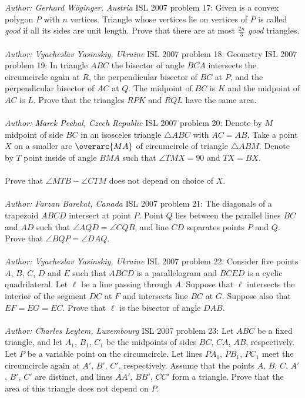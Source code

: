 \textit{Author: Gerhard Wöginger, Austria} 
ISL 2007 problem 17:  Given is a convex polygon $ P$ with $ n$ vertices. Triangle whose vertices lie on vertices of $ P$ is called \textit{good } if all its sides are unit length. Prove that there are at most $ \frac {2n}{3}$ \textit{good} triangles. \\\\
\textit{Author: Vyacheslav Yasinskiy, Ukraine} 
ISL 2007 problem 18:  Geometry 
ISL 2007 problem 19:  In triangle $ ABC$ the bisector of angle $ BCA$ intersects the circumcircle again at $ R$, the perpendicular bisector of $ BC$ at $ P$, and the perpendicular bisector of $ AC$ at $ Q$. The midpoint of $ BC$ is $ K$ and the midpoint of $ AC$ is $ L$. Prove that the triangles $ RPK$ and $ RQL$ have the same area. \\\\
\textit{Author: Marek Pechal, Czech Republic} 
ISL 2007 problem 20:  Denote by $ M$ midpoint of side $ BC$ in an isosceles triangle $ \triangle ABC$ with $ AC = AB$. Take a point $ X$ on a smaller arc $ \overarc{MA}$ of circumcircle of triangle $ \triangle ABM$. Denote by $ T$ point inside of angle $ BMA$ such that $ \angle TMX = 90$ and $ TX = BX$. \\\\
Prove that $ \angle MTB - \angle CTM$ does not depend on choice of $ X$. \\\\
\textit{Author: Farzan Barekat, Canada} 
ISL 2007 problem 21:  The diagonals of a trapezoid $ ABCD$ intersect at point $ P$. Point $ Q$ lies between the parallel lines $ BC$ and $ AD$ such that $ \angle AQD = \angle CQB$, and line $ CD$ separates points $ P$ and $ Q$. Prove that $ \angle BQP = \angle DAQ$. \\\\
\textit{Author: Vyacheslav Yasinskiy, Ukraine} 
ISL 2007 problem 22:  Consider five points $ A$, $ B$, $ C$, $ D$ and $ E$ such that $ ABCD$ is a parallelogram and $ BCED$ is a cyclic quadrilateral. Let $ \ell$ be a line passing through $ A$. Suppose that $ \ell$ intersects the interior of the segment $ DC$ at $ F$ and intersects line $ BC$ at $ G$. Suppose also that $ EF = EG = EC$. Prove that $ \ell$ is the bisector of angle $ DAB$. \\\\
\textit{Author: Charles Leytem, Luxembourg} 
ISL 2007 problem 23:  Let $ ABC$ be a fixed triangle, and let $ A_1$, $ B_1$, $ C_1$ be the midpoints of sides $ BC$, $ CA$, $ AB$, respectively. Let $ P$ be a variable point on the circumcircle. Let lines $ PA_1$, $ PB_1$, $ PC_1$ meet the circumcircle again at $ A'$, $ B'$, $ C'$, respectively. Assume that the points $ A$, $ B$, $ C$, $ A'$, $ B'$, $ C'$ are distinct, and lines $ AA'$, $ BB'$, $ CC'$ form a triangle. Prove that the area of this triangle does not depend on $ P$. \\\\
